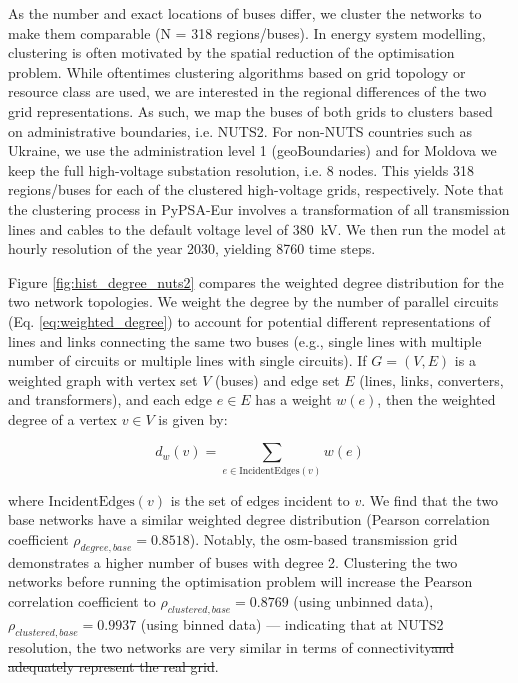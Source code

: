 \documentclass[fleqn,10pt]{wlscirep}
\let\autocite\cite
\providecommand{\DIFdeltex}[1]{{\protect\color{red}\sout{#1}}}                      %
\providecommand{\DIFdelbegin}{} %
\providecommand{\DIFdelend}{} %
\providecommand{\DIFdel}[1]{\texorpdfstring{\DIFdeltex{#1}}{}} %
\begin{document}
As the number and exact locations of buses differ, we cluster the networks to make them comparable (N = 318 regions/buses). In energy system modelling, clustering is often motivated by the spatial reduction of the optimisation problem. While oftentimes clustering algorithms based on grid topology or resource class are used, \autocite{frysztackiComparisonClusteringMethods2022} we are interested in the regional differences of the two grid representations. As such, we map the buses of both grids to clusters based on administrative boundaries, i.e. NUTS2. For non-NUTS countries such as Ukraine, we use the administration level 1 (geoBoundaries\autocite{runfolaGeoBoundariesGlobalDatabase2020}) and for Moldova we keep the full high-voltage substation resolution, i.e. 8 nodes. This yields 318 regions/buses for each of the clustered high-voltage grids, respectively. Note that the clustering process in PyPSA-Eur involves a transformation of all transmission lines and cables to the default voltage level of \SI{380}{\kilo\volt}. We then run the model at hourly resolution of the year 2030, yielding 8760 time steps. 

Figure \ref{fig:hist_degree_nuts2} compares the weighted degree distribution for the two network topologies. We weight the degree by the number of parallel circuits (Eq. \ref{eq:weighted_degree}) to account for potential different representations of lines and links connecting the same two buses (e.g., single lines with multiple number of circuits or multiple lines with single circuits). If \( G = (V, E) \) is a weighted graph with vertex set \( V \) (buses) and edge set \( E \) (lines, links, converters, and transformers), and each edge \( e \in E \) has a weight \( w(e) \), then the weighted degree of a vertex \( v \in V \) is given by:

\DIFdelbegin %

\DIFdelend \begin{equation}
    d_w(v) = \sum_{e \in \text{IncidentEdges}(v)} w(e)
    \label{eq:weighted_degree}
\end{equation}

where \( \text{IncidentEdges}(v) \) is the set of edges incident to \( v \). We find that the two base networks have a similar weighted degree distribution (Pearson correlation coefficient $\rho_{degree,base} = 0.8518$). Notably, the \acrshort{osm}-based transmission grid demonstrates a higher number of buses with degree 2. Clustering the two networks before running the optimisation problem will increase the Pearson correlation coefficient to $\rho_{clustered,base} = 0.8769$ (using unbinned data), $\rho_{clustered,base} = 0.9937$ (using binned data) --- indicating that at NUTS2 resolution, the two networks are very similar in terms of connectivity\DIFdelbegin \DIFdel{and adequately represent the real grid}\DIFdelend .
\end{document}
